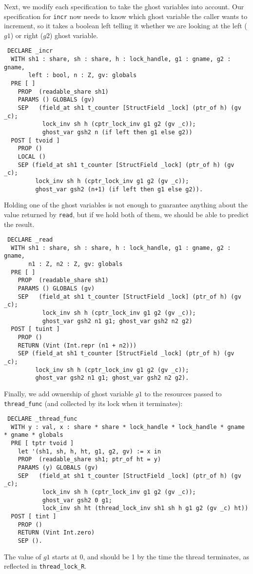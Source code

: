 \documentclass[11pt]{article}
\begin{document}
Next, we modify each specification to take the ghost variables into account. Our specification for \texttt{incr} now needs to know which ghost variable the caller wants to increment, so it takes a boolean \textsf{left} telling it whether we are looking at the left ($g1$) or right ($g2$) ghost variable. %
\begin{verbatim}
 DECLARE _incr
  WITH sh1 : share, sh : share, h : lock_handle, g1 : gname, g2 : gname,
       left : bool, n : Z, gv: globals
  PRE [ ]
    PROP  (readable_share sh1)
    PARAMS () GLOBALS (gv)
    SEP   (field_at sh1 t_counter [StructField _lock] (ptr_of h) (gv _c);
           lock_inv sh h (cptr_lock_inv g1 g2 (gv _c));
           ghost_var gsh2 n (if left then g1 else g2))
  POST [ tvoid ]
    PROP ()
    LOCAL ()
    SEP (field_at sh1 t_counter [StructField _lock] (ptr_of h) (gv _c);
         lock_inv sh h (cptr_lock_inv g1 g2 (gv _c));
         ghost_var gsh2 (n+1) (if left then g1 else g2)).
\end{verbatim}
Holding one of the ghost variables is not enough to guarantee anything about the value returned by \texttt{read}, but if we hold both of them, we should be able to predict the result.
\begin{verbatim}
 DECLARE _read
  WITH sh1 : share, sh : share, h : lock_handle, g1 : gname, g2 : gname,
       n1 : Z, n2 : Z, gv: globals
  PRE [ ]
    PROP  (readable_share sh1)
    PARAMS () GLOBALS (gv)
    SEP   (field_at sh1 t_counter [StructField _lock] (ptr_of h) (gv _c);
           lock_inv sh h (cptr_lock_inv g1 g2 (gv _c));
           ghost_var gsh2 n1 g1; ghost_var gsh2 n2 g2)
  POST [ tuint ]
    PROP ()
    RETURN (Vint (Int.repr (n1 + n2)))
    SEP (field_at sh1 t_counter [StructField _lock] (ptr_of h) (gv _c);
         lock_inv sh h (cptr_lock_inv g1 g2 (gv _c));
         ghost_var gsh2 n1 g1; ghost_var gsh2 n2 g2).
\end{verbatim}
Finally, we add ownership of ghost variable $g1$ to the resources passed to \texttt{thread\_func} (and collected by its lock when it terminates):
\begin{verbatim}
 DECLARE _thread_func
  WITH y : val, x : share * share * lock_handle * lock_handle * gname * gname * globals
  PRE [ tptr tvoid ]
    let '(sh1, sh, h, ht, g1, g2, gv) := x in
    PROP  (readable_share sh1; ptr_of ht = y)
    PARAMS (y) GLOBALS (gv)
    SEP   (field_at sh1 t_counter [StructField _lock] (ptr_of h) (gv _c);
           lock_inv sh h (cptr_lock_inv g1 g2 (gv _c));
           ghost_var gsh2 0 g1;
           lock_inv sh ht (thread_lock_inv sh1 sh h g1 g2 (gv _c) ht))
  POST [ tint ]
    PROP ()
    RETURN (Vint Int.zero)
    SEP ().
\end{verbatim}
The value of $g1$ starts at 0, and should be 1 by the time the thread terminates, as reflected in \texttt{thread\_lock\_R}.
\end{document}
